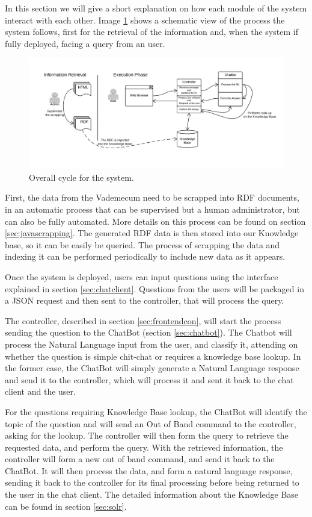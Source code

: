 In this section we will give a short explanation on how each module of the system interact with each other. Image \ref{fig:lifecycle} shows a schematic view of the process the system follows, first for the retrieval of the information and, when the system if fully deployed, facing a query from an user.

\begin{figure}[!htbp]
    \centering
    \includegraphics[width=1.1\textwidth]{img/prot/lifecycle.png}
    \caption{Overall cycle for the system.}
    \label{fig:lifecycle}
\end{figure}

First, the data from the Vademecum need to be scrapped into RDF documents, in an automatic process that can be supervised but a human administrator, but can also be fully automated. More details on this process can be found on section \ref{sec:javascrapping}. The generated RDF data is then stored into our Knowledge base, so it can be easily be queried. The process of scrapping the data and indexing it can be performed periodically to include new data as it appears.

Once the system is deployed, users can input questions using the interface explained in section \ref{sec:chatclient}. Questions from the users will be packaged in a JSON request and then sent to the controller, that will process the query.

The controller, described in section \ref{sec:frontendcon}, will start the process sending the question to the ChatBot (section \ref{sec:chatbot}). The Chatbot will process the Natural Language input from the user, and classify it, attending on whether the question is simple chit-chat or requires a knowledge base lookup. In the former case, the ChatBot will simply generate a Natural Language response and send it to the controller, which will process it and sent it back to the chat client and the user. 

For the questions requiring Knowledge Base lookup, the ChatBot will identify the topic of the question and will send an Out of Band command to the controller, asking for the lookup. The controller will then form the query to retrieve the requested data, and perform the query. With the retrieved information, the controller will form a new out of band command, and send it back to the ChatBot. It will then process the data, and form a natural language response, sending it back to the controller for its final processing before being returned to the user in the chat client. The detailed information about the Knowledge Base can be found in section \ref{sec:solr}.

